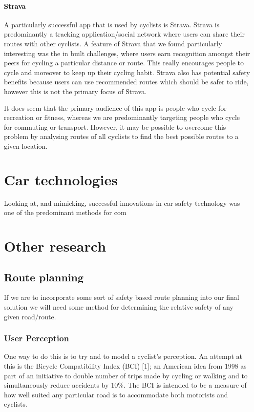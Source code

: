 \documentclass[a4paper]{report}
\begin{document}
\paragraph{Strava} A particularly successful app that is used by cyclists is Strava\cite{strava}. Strava is predominantly a tracking application/social network where users can share their routes with other cyclists. A feature of Strava that we found particularly interesting was the in built challenges, where users earn recognition amongst their peers for cycling a particular distance or route. This really encourages people to cycle and moreover to keep up their cycling habit. Strava also has potential safety benefits because users can use recommended routes which should be safer to ride, however this is not the primary focus of Strava.

It does seem that the primary audience of this app is people who cycle for recreation or fitness, whereas we are predominantly targeting people who cycle for commuting or transport. However, it may be possible to overcome this problem by analysing routes of all cyclists to find the best possible routes to a given location.


\newpage
\section{Car technologies}
Looking at, and mimicking, successful innovations in car safety technology was one of the predominant methods for com
\newpage
\section{Other research}
\subsection{Route planning}
If we are to incorporate some sort of safety based route planning into our final solution we will need some method for determining the relative safety of any given road/route.

\subsubsection{User Perception}
One way to do this is to try and to model a cyclist's perception. An attempt at this is the Bicycle Compatibility Index (BCI) [1]; an American idea from 1998 as part of an initiative to double number of trips made by cycling or walking and to simultaneously reduce accidents by 10\%. The BCI is intended to be a measure of how well suited any particular road is to accommodate both motorists and cyclists.
\end{document}
